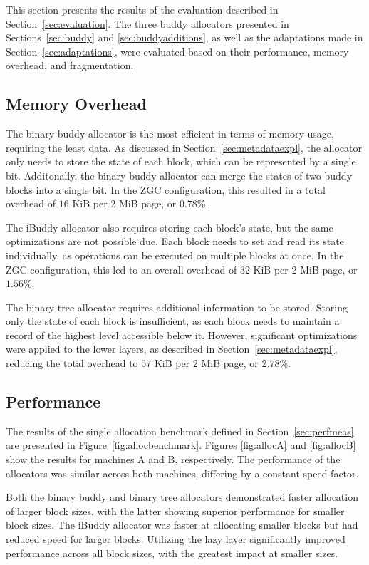 This section presents the results of the evaluation described in Section~\ref{sec:evaluation}. The three buddy allocators presented in Sections~\ref{sec:buddy} and \ref{sec:buddyadditions}, as well as the adaptations made in Section~\ref{sec:adaptations}, were evaluated based on their performance, memory overhead, and fragmentation.

\subsection{Memory Overhead}
The binary buddy allocator is the most efficient in terms of memory usage, requiring the least data. As discussed in Section~\ref{sec:metadataexpl}, the allocator only needs to store the state of each block, which can be represented by a single bit. Additonally, the binary buddy allocator can merge the states of two buddy blocks into a single bit. In the ZGC configuration, this resulted in a total overhead of $16$ KiB per $2$ MiB page, or $0.78$\%.

The iBuddy allocator also requires storing each block's state, but the same optimizations are not possible due. Each block needs to set and read its state individually, as operations can be executed on multiple blocks at once. In the ZGC configuration, this led to an overall overhead of $32$ KiB per $2$ MiB page, or $1.56$\%.

The binary tree allocator requires additional information to be stored. Storing only the state of each block is insufficient, as each block needs to maintain a record of the highest level accessible below it. However, significant optimizations were applied to the lower layers, as described in Section~\ref{sec:metadataexpl}, reducing the total overhead to $57$ KiB per $2$ MiB page, or $2.78$\%.

\subsection{Performance}
The results of the single allocation benchmark defined in Section~\ref{sec:perfmeas} are presented in Figure~\ref{fig:allocbenchmark}. Figures \ref{fig:allocA} and \ref{fig:allocB} show the results for machines A and B, respectively. The performance of the allocators was similar across both machines, differing by a constant speed factor.

Both the binary buddy and binary tree allocators demonstrated faster allocation of larger block sizes, with the latter showing superior performance for smaller block sizes. The iBuddy allocator was faster at allocating smaller blocks but had reduced speed for larger blocks. Utilizing the lazy layer significantly improved performance across all block sizes, with the greatest impact at smaller sizes.

